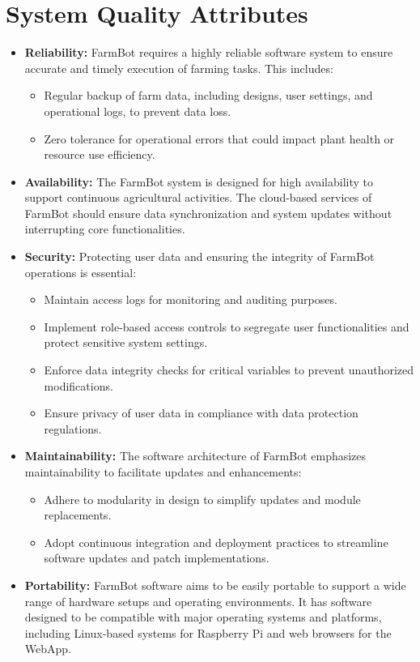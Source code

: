 \section{System Quality Attributes}
\begin{itemize}
    \item \textbf{Reliability:} FarmBot requires a highly reliable software system to ensure accurate and timely execution of farming tasks. This includes:
    \begin{itemize}
        \item Regular backup of farm data, including designs, user settings, and operational logs, to prevent data loss.
        \item Zero tolerance for operational errors that could impact plant health or resource use efficiency.
    \end{itemize}
    \item \textbf{Availability:} The FarmBot system is designed for high availability to support continuous agricultural activities. The cloud-based services of FarmBot should ensure data synchronization and system updates without interrupting core functionalities.
    \item \textbf{Security:} Protecting user data and ensuring the integrity of FarmBot operations is essential:
    \begin{itemize}
        \item Maintain access logs for monitoring and auditing purposes.
        \item Implement role-based access controls to segregate user functionalities and protect sensitive system settings.
        \item Enforce data integrity checks for critical variables to prevent unauthorized modifications.
        \item Ensure privacy of user data in compliance with data protection regulations.
    \end{itemize}
    \item \textbf{Maintainability:} The software architecture of FarmBot emphasizes maintainability to facilitate updates and enhancements:
    \begin{itemize}
        \item Adhere to modularity in design to simplify updates and module replacements.
        \item Adopt continuous integration and deployment practices to streamline software updates and patch implementations.
    \end{itemize}
    \item \textbf{Portability:} FarmBot software aims to be easily portable to support a wide range of hardware setups and operating environments. It has software designed to be compatible with major operating systems and platforms, including Linux-based systems for Raspberry Pi and web browsers for the WebApp.
\end{itemize}

